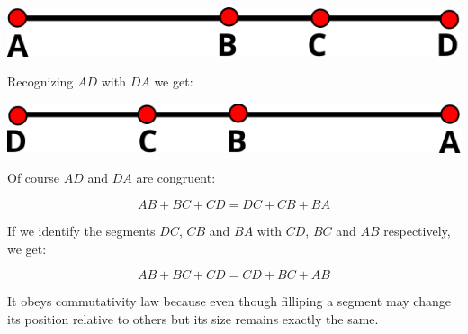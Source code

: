 \begin{enumerate}
	\includegraphics[scale=0.8]{chapters/ch00/images/19a}
	
	Recognizing $AD$ with $DA$ we get:
	
	\includegraphics[scale=0.8]{chapters/ch00/images/19b}
	
	Of course $AD$ and $DA$ are congruent:
	
	$$ AB + BC + CD = DC + CB + BA $$
	
	If we identify the segments $DC$, $CB$ and $BA$ with $CD$, $BC$ and $AB$ respectively, we get:
	
	$$ AB + BC + CD = CD + BC + AB $$
	
	It obeys commutativity law because even though filliping a segment may change its position relative to others but its size remains exactly the same.
	
\end{enumerate}